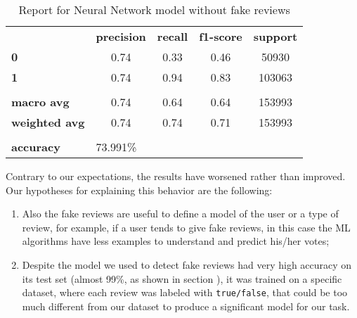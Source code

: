 \begin{table}[h!]
    \centering
    \begin{tabular}{lcccc}
        \rowcolor[HTML]{EEEEEE} 
        \cellcolor[HTML]{FBFBFB} & \textbf{precision} & \textbf{recall} & \textbf{f1-score} & \textbf{support} \\
        \rowcolor[HTML]{EEEEEE} 
        \textbf{0}               & 0.74               & 0.33            & 0.46              & 50930            \\
        \rowcolor[HTML]{EEEEEE} 
        \textbf{1}               & 0.74               & 0.94            & 0.83              & 103063           \\
        \rowcolor[HTML]{FBFBFB} 
        &                    &                 &                   &                  \\
        \rowcolor[HTML]{EEEEEE} 
        \textbf{macro avg}       & 0.74               & 0.64            & 0.64              & 153993           \\
        \rowcolor[HTML]{EEEEEE} 
        \textbf{weighted avg}    & 0.74               & 0.74            & 0.71              & 153993           \\
        \rowcolor[HTML]{FBFBFB} 
        &                    &                 &                   &                  \\
        \rowcolor[HTML]{EEEEEE} 
        \textbf{accuracy}        & \multicolumn{4}{l}{\cellcolor[HTML]{EEEEEE}73.991\%}                         
    \end{tabular}
    \caption{Report for Neural Network model without fake reviews}
    \label{tab:nn-res-no-fake}
\end{table}

Contrary to our expectations, the results have worsened rather than improved.\\
Our hypotheses for explaining this behavior are the following:
\begin{enumerate}
    \item Also the fake reviews are useful to define a model of the user or a type of review, for example, if a user tends to give fake reviews, in this case the ML algorithms have less examples to understand and predict his/her votes;
    \item Despite the model we used to detect fake reviews had very high accuracy on its test set (almost 99\%, as shown in section ), it was trained on a specific dataset, where each review was labeled with  \texttt{true/false}, that could be too much different from our dataset to produce a significant model for our task.
\end{enumerate}

